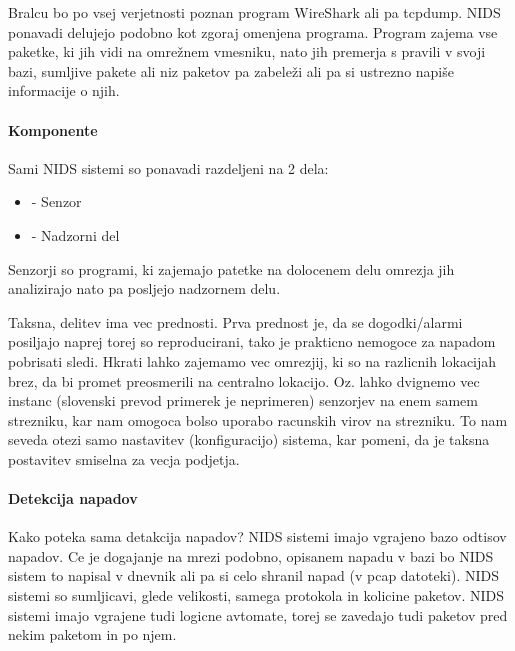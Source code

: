 \documentclass[12pt]{article}
\begin{document}
Bralcu bo po vsej verjetnosti poznan program WireShark ali pa tcpdump.
NIDS ponavadi delujejo podobno kot zgoraj omenjena programa. Program zajema vse paketke, ki jih vidi na omrežnem vmesniku,
nato jih premerja s pravili v svoji bazi, sumljive pakete ali niz paketov pa zabeleži ali pa si ustrezno napiše informacije o njih.

\paragraph{Komponente} %
\label{par:Komponente}

Sami NIDS sistemi so ponavadi razdeljeni na 2 dela:
\begin{itemize}
    \item - Senzor
    \item - Nadzorni del
\end{itemize}

Senzorji so programi, ki zajemajo patetke na dolocenem delu omrezja jih analizirajo nato pa posljejo nadzornem delu.

Taksna, delitev ima vec prednosti. Prva prednost je, da se dogodki/alarmi posiljajo naprej torej so reproducirani, tako je prakticno nemogoce za napadom pobrisati sledi.
Hkrati lahko zajemamo vec omrezjij, ki so na razlicnih lokacijah brez, da bi promet preosmerili na centralno lokacijo.
Oz. lahko dvignemo vec instanc (slovenski prevod primerek je neprimeren) senzorjev na enem samem strezniku, kar nam omogoca bolso uporabo racunskih virov na strezniku.
To nam seveda otezi samo nastavitev (konfiguracijo) sistema, kar pomeni, da je taksna postavitev smiselna za vecja podjetja.


\paragraph{Detekcija napadov} %
\label{par:Detekcija napadov}

Kako poteka sama detakcija napadov? 
NIDS sistemi imajo vgrajeno bazo odtisov napadov. Ce je dogajanje na mrezi podobno, opisanem napadu v bazi
bo NIDS sistem to napisal v dnevnik ali pa si celo shranil napad (v pcap datoteki). 
NIDS sistemi so sumljicavi, glede velikosti, samega protokola in kolicine paketov.
NIDS sistemi imajo vgrajene tudi logicne avtomate, torej se zavedajo tudi paketov pred nekim paketom in po njem.

\end{document}
